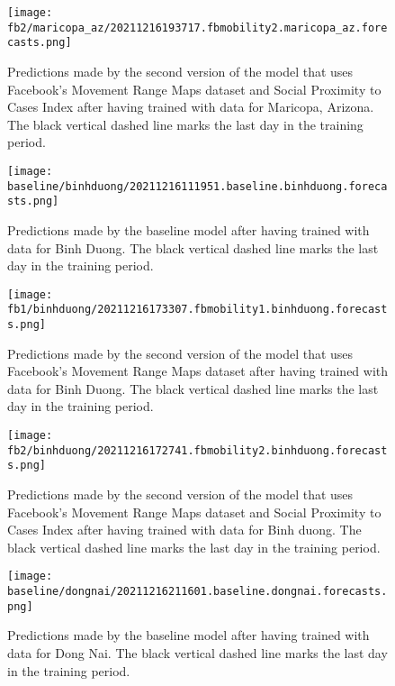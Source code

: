\begin{figure}[!htb]
    \centering
    \texttt{[image: fb2/maricopa\_az/20211216193717.fbmobility2.maricopa\_az.forecasts.png]}
    \caption{Predictions made by the second version of the model that uses Facebook's Movement Range Maps dataset and Social Proximity to Cases Index after having trained with data for Maricopa, Arizona. The black vertical dashed line marks the last day in the training period.}
    \label{fig:predictions-maricopa-fb2}
\end{figure}


\begin{figure}[!htb]
    \centering
    \texttt{[image: baseline/binhduong/20211216111951.baseline.binhduong.forecasts.png]}
    \caption{Predictions made by the baseline model after having trained with data for Binh Duong. The black vertical dashed line marks the last day in the training period.}
    \label{fig:predictions-binhduong-baseline}
\end{figure}

\begin{figure}[!htb]
    \centering
    \texttt{[image: fb1/binhduong/20211216173307.fbmobility1.binhduong.forecasts.png]}
    \caption{Predictions made by the second version of the model that uses Facebook's Movement Range Maps dataset after having trained with data for Binh Duong. The black vertical dashed line marks the last day in the training period.}
    \label{fig:predictions-binhduong-fb1}
\end{figure}

\begin{figure}[!htb]
    \centering
    \texttt{[image: fb2/binhduong/20211216172741.fbmobility2.binhduong.forecasts.png]}
    \caption{Predictions made by the second version of the model that uses Facebook's Movement Range Maps dataset and Social Proximity to Cases Index after having trained with data for Binh duong. The black vertical dashed line marks the last day in the training period.}
    \label{fig:predictions-binhduong-fb2}
\end{figure}


\begin{figure}[!htb]
    \centering
    \texttt{[image: baseline/dongnai/20211216211601.baseline.dongnai.forecasts.png]}
    \caption{Predictions made by the baseline model after having trained with data for Dong Nai. The black vertical dashed line marks the last day in the training period.}
    \label{fig:predictions-dongnai-baseline}
\end{figure}

